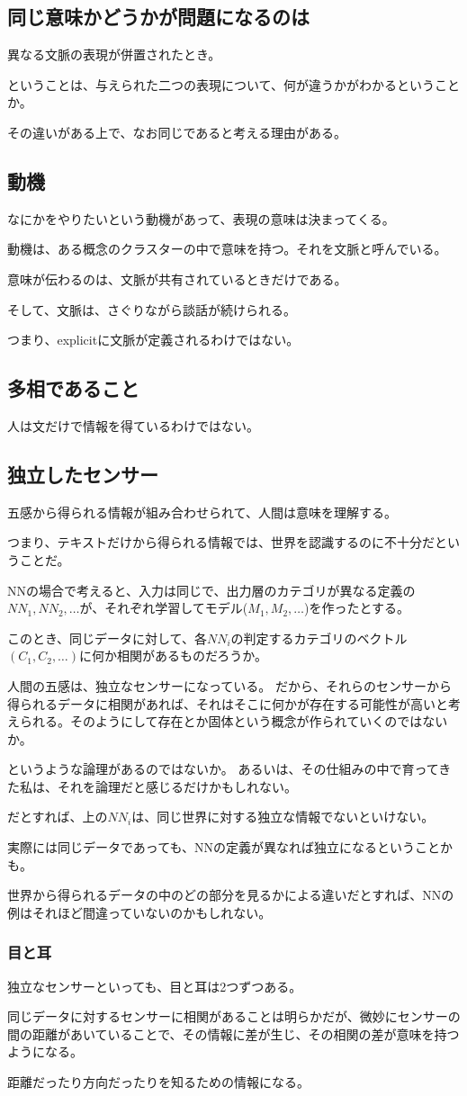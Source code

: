 \documentclass[10pt, oneside]{jarticle}   	%
\begin{document}
\subsection{同じ意味かどうかが問題になるのは}
異なる文脈の表現が併置されたとき。

ということは、与えられた二つの表現について、何が違うかがわかるということか。

その違いがある上で、なお同じであると考える理由がある。

\subsection{動機}
なにかをやりたいという動機があって、表現の意味は決まってくる。

動機は、ある概念のクラスターの中で意味を持つ。それを文脈と呼んでいる。

意味が伝わるのは、文脈が共有されているときだけである。

そして、文脈は、さぐりながら談話が続けられる。

つまり、explicitに文脈が定義されるわけではない。

\subsection{多相であること}
人は文だけで情報を得ているわけではない。

\subsection{独立したセンサー}
五感から得られる情報が組み合わせられて、人間は意味を理解する。

つまり、テキストだけから得られる情報では、世界を認識するのに不十分だということだ。

NNの場合で考えると、入力は同じで、出力層のカテゴリが異なる定義の$NN_1, NN_2, \dots$が、それぞれ学習してモデル($M_1, M_2, \dots$)を作ったとする。

このとき、同じデータに対して、各$NN_i$の判定するカテゴリのベクトル$(C_1,C_2,\dots)$に何か相関があるものだろうか。

人間の五感は、独立なセンサーになっている。
だから、それらのセンサーから得られるデータに相関があれば、それはそこに何かが存在する可能性が高いと考えられる。そのようにして存在とか固体という概念が作られていくのではないか。

というような論理があるのではないか。
あるいは、その仕組みの中で育ってきた私は、それを論理だと感じるだけかもしれない。

だとすれば、上の$NN_i$は、同じ世界に対する独立な情報でないといけない。

実際には同じデータであっても、NNの定義が異なれば独立になるということかも。

世界から得られるデータの中のどの部分を見るかによる違いだとすれば、NNの例はそれほど間違っていないのかもしれない。
\subsubsection{目と耳}
独立なセンサーといっても、目と耳は2つずつある。

同じデータに対するセンサーに相関があることは明らかだが、微妙にセンサーの間の距離があいていることで、その情報に差が生じ、その相関の差が意味を持つようになる。

距離だったり方向だったりを知るための情報になる。
\end{document}
